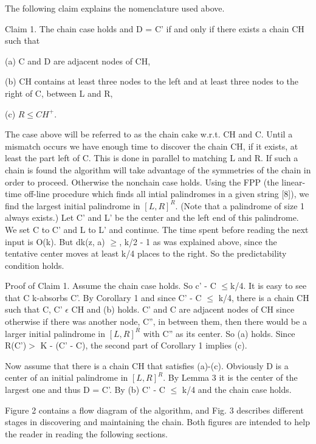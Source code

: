 \documentclass[11pt,a4paper]{report}
\begin{document}
The following claim explains the nomenclature used above.

Claim 1. The chain case holds and D = C’ if and only if there exists a chain CH
such that

(a) C and D are adjacent nodes of CH,

(b) CH contains at least three nodes to the left and at least three nodes to the
right of C, between L and R,

(c) $R \leq CH^+$.

The case above will be referred to as the chain cake w.r.t. CH and C. Until a mismatch
occurs we have enough time to discover the chain CH, if it exists, at least the part left
of C. This is done in parallel to matching L and R. If such a chain is found the algorithm
will take advantage of the symmetries of the chain in order to proceed. Otherwise the
nonchain case holds. Using the FPP (the linear-time off-line procedure which finds
all intial palindromes in a given string [8]), we find the largest initial palindrome in $[L, R]^R $.
(Note that a palindrome of size 1 always exists.) Let C’ and L’ be the center and the left
end of this palindrome. We set C to C’ and L to L’ and continue. The time spent before
reading the next input is O(k). But dk(z, a) $\geq$, k/2 - 1 as was explained above, since
the tentative center moves at least k/4 places to the right. So the predictability condition
holds. 

Proof of Claim 1. Assume the chain case holds. So c’ - C $\leq $k/4. It is easy to see
that C k-absorbs C’. By Corollary 1 and since C’ - C $\leq$ k/4, there is a chain CH such
that C, C’ $\epsilon $ CH and (b) holds. C’ and C are adjacent nodes of CH since otherwise if
there was another node, C”, in between them, then there would be a larger initial palindrome in $[L, R]^R$ with C”
 as its center. So (a) holds. Since R(C’)$ >$ K - (C’ - C), the second part of Corollary 1 implies (c).

Now assume that there is a chain CH that satisfies (a)-(c). Obviously D is a center of an
initial palindrome in $[L,R]^R$. By Lemma 3 it is the center of the largest one and thus
D = C’. By (b) C’ - C $\leq$ k/4 and the chain case holds. 

Figure 2 contains a flow diagram of the algorithm, and Fig. 3 describes different
stages in discovering and maintaining the chain. Both figures are intended to help the
reader in reading the following sections.
\end{document}
